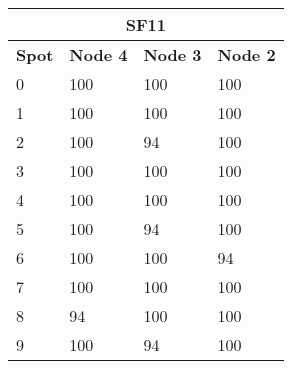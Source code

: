 \begin{tabular}{|l|l|l|l|}
\multicolumn{4}{c}{\textbf{SF11}} \\ \hline 
\textbf{Spot} & \textbf{Node 4} & \textbf{Node 3} & \textbf{Node 2} \\ \hline
0 & 100 & 100 & 100 \\ \hline
1 & 100 & 100 & 100 \\ \hline
2 & 100 & 94 & 100 \\ \hline
3 & 100 & 100 & 100 \\ \hline
4 & 100 & 100 & 100 \\ \hline
5 & 100 & 94 & 100 \\ \hline
6 & 100 & 100 & 94 \\ \hline
7 & 100 & 100 & 100 \\ \hline
8 & 94 & 100 & 100 \\ \hline
9 & 100 & 94 & 100 \\ \hline
\end{tabular}
